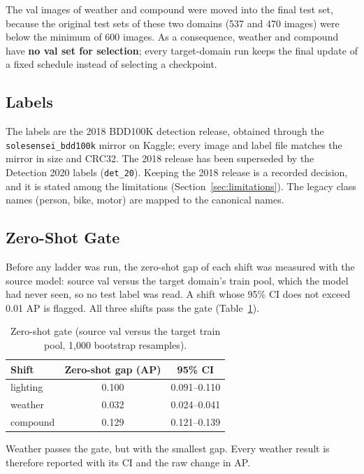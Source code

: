 The val images of weather and compound were moved into the final test set, because the original test sets of these two domains (537 and 470 images) were below the minimum of 600 images. As a consequence, weather and compound have \textbf{no val set for selection}; every target-domain run keeps the final update of a fixed schedule instead of selecting a checkpoint.

\subsection{Labels}\label{sec:labels}

The labels are the 2018 BDD100K detection release, obtained through the \texttt{solesensei\_bdd100k} mirror on Kaggle; every image and label file matches the mirror in size and CRC32. The 2018 release has been superseded by the Detection 2020 labels (\texttt{det\_20}). Keeping the 2018 release is a recorded decision, and it is stated among the limitations (Section~\ref{sec:limitations}). The legacy class names (person, bike, motor) are mapped to the canonical names.

\subsection{Zero-Shot Gate}\label{sec:gate}

Before any ladder was run, the zero-shot gap of each shift was measured with the source model: source val versus the target domain's train pool, which the model had never seen, so no test label was read. A shift whose 95\% CI does not exceed 0.01 AP is flagged. All three shifts pass the gate (Table~\ref{tab:gate}).

\begin{table}[t]
\centering
\caption{Zero-shot gate (source val versus the target train pool, 1,000 bootstrap resamples).}
\label{tab:gate}
\footnotesize
\setlength{\tabcolsep}{3pt}
\begin{tabular}{@{}lcc@{}}
\toprule
Shift & Zero-shot gap (AP) & 95\% CI \\
\midrule
lighting & 0.100 & 0.091--0.110 \\
weather  & 0.032 & 0.024--0.041 \\
compound & 0.129 & 0.121--0.139 \\
\bottomrule
\end{tabular}
\end{table}

Weather passes the gate, but with the smallest gap. Every weather result is therefore reported with its CI and the raw change in AP.

